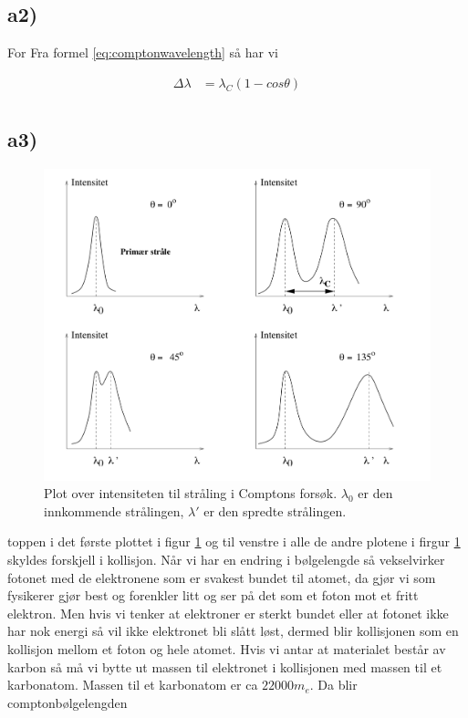 \documentclass[norsk,a4paper,12pt]{article}
\begin{document}
\subsection*{a2)}

For Fra formel \ref{eq:comptonwavelength} så har vi 

\begin{align*}
\Delta\lambda &= \lambda_C(1-cos\theta)\\
\end{align*}


\subsection*{a3)}


\begin{figure}[h]
\includegraphics[scale=0.4]{intensitetcompton}
\caption{Plot over intensiteten til stråling i Comptons forsøk. $\lambda_0$ er den innkommende strålingen, $\lambda'$ er den spredte strålingen.}
\label{fig:intensitetcompton}
\end{figure}

toppen i det første plottet i figur \ref{fig:intensitetcompton} og  til venstre i alle de andre plotene i firgur \ref{fig:intensitetcompton}  skyldes forskjell i kollisjon. Når vi har en endring i bølgelengde så vekselvirker fotonet med de elektronene som er svakest bundet til atomet, da gjør vi som fysikerer gjør best og forenkler litt og ser på det som et foton mot et fritt elektron. Men hvis vi tenker at elektroner er sterkt bundet eller at fotonet ikke har nok energi så vil ikke elektronet bli slått løst, dermed blir kollisjonen som en kollisjon mellom et foton og hele atomet. Hvis vi antar at materialet består av karbon så må vi bytte ut massen til elektronet i kollisjonen med massen til et karbonatom. Massen til et karbonatom er ca $22000m_e$. Da blir comptonbølgelengden 
\end{document}

